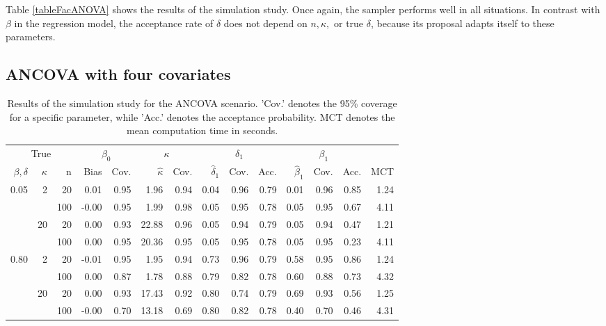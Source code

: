 Table \ref{tableFacANOVA} shows the results of the simulation study. Once again, the sampler performs well in all situations. In contrast with \( \beta \) in the regression model, the  acceptance rate of \( \delta \) does not depend on \( n, \kappa, \) or true \( \delta \),  because its proposal adapts itself to these parameters.

\subsection{ANCOVA with four covariates}

\begin{table}[btp]
\centering
\begin{small}
\caption{Results of the simulation study for the ANCOVA scenario. 'Cov.' denotes the 95\% coverage for a specific parameter, while 'Acc.' denotes the acceptance probability. MCT denotes the mean computation time in seconds.} 
\label{tableANCOVA}
\begin{tabular}{rrrrrrrrrrrrrr}
  \toprule \multicolumn{3}{c}{True} & \multicolumn{2}{c}{$\beta_0$} & \multicolumn{2}{c}{$\kappa$} & \multicolumn{3}{c}{$\delta_1$} & \multicolumn{3}{c}{$\beta_1$} \\  \cmidrule(lr){1-3} \cmidrule(lr){4-5} \cmidrule(lr){6-7} \cmidrule(lr){8-10} \cmidrule(lr){11-13}$\beta , \delta$ & $\kappa$ & n & Bias & Cov. & $\hat{\kappa}$ & Cov. & $\hat{\delta}_1$ & Cov. & Acc. & $\hat{\beta}_1$ & Cov. & Acc. & MCT \\ 
  \midrule
0.05 & 2 & 20 & 0.01 & 0.95 & 1.96 & 0.94 & 0.04 & 0.96 & 0.79 & 0.01 & 0.96 & 0.85 & 1.24 \\ 
   \vspace{0.2cm}  &  & 100 & -0.00 & 0.95 & 1.99 & 0.98 & 0.05 & 0.95 & 0.78 & 0.05 & 0.95 & 0.67 & 4.11 \\ 
   & 20 & 20 & 0.00 & 0.93 & 22.88 & 0.96 & 0.05 & 0.94 & 0.79 & 0.05 & 0.94 & 0.47 & 1.21 \\ 
   \vspace{0.2cm}  &  & 100 & 0.00 & 0.95 & 20.36 & 0.95 & 0.05 & 0.95 & 0.78 & 0.05 & 0.95 & 0.23 & 4.11 \\ 
  0.80 & 2 & 20 & -0.01 & 0.95 & 1.95 & 0.94 & 0.73 & 0.96 & 0.79 & 0.58 & 0.95 & 0.86 & 1.24 \\ 
   \vspace{0.2cm}  &  & 100 & 0.00 & 0.87 & 1.78 & 0.88 & 0.79 & 0.82 & 0.78 & 0.60 & 0.88 & 0.73 & 4.32 \\ 
   & 20 & 20 & 0.00 & 0.93 & 17.43 & 0.92 & 0.80 & 0.74 & 0.79 & 0.69 & 0.93 & 0.56 & 1.25 \\ 
   &  & 100 & -0.00 & 0.70 & 13.18 & 0.69 & 0.80 & 0.82 & 0.78 & 0.40 & 0.70 & 0.46 & 4.31 \\ 
   \bottomrule
\end{tabular}
\end{small}
\end{table}


